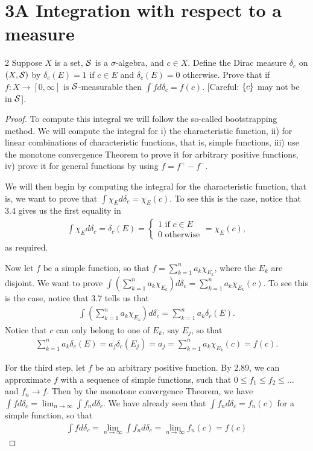 \section{3A Integration with respect to a measure}


\begin{exercise}{2}
Suppose $X$ is a set, $\mathcal{S}$ is a $\sigma$-algebra, and $c \in X$.
Define the Dirac measure $\delta_c$ on $(X,\mathcal{S})$ by $\delta_c(E) = 1$ if $c \in E$ and $\delta_c(E) = 0$ otherwise.
Prove that if $f: X \to [0, \infty]$ is $\mathcal{S}$-measurable then $\int f d\delta_c = f(c)$.
[Careful: $\{c\}$ may not be in $\mathcal{S}$].
\end{exercise}
\begin{proof}
To compute this integral we will follow the so-called bootstrapping method.
We will compute the integral for 
i) the characteristic function,
ii) for linear combinations of characteristic functions, that is, simple functions,
iii) use the monotone convergence Theorem to prove it for arbitrary positive functions,
iv) prove it for general functions by using $f = f^+ - f^-$.

We will then begin by computing the integral for the characteristic function,
that is, we want to prove that $\int \chi_E d\delta_c = \chi_E(c)$.
To see this is the case, notice that 3.4 gives us the first equality in
\begin{align*}
    \int \chi_E d\delta_c 
    = \delta_c(E)
    = \begin{cases}
        1 \text{ if } c \in E\\
        0 \text{ otherwise}
    \end{cases}
    = \chi_E(c),
\end{align*}
as required.

Now let $f$ be a simple function, so that $f = \sum_{k=1}^n a_k \chi_{E_k}$, where the $E_k$ are disjoint.
We want to prove $\int (\sum_{k=1}^n a_k \chi_{E_k}) d\delta_c = \sum_{k=1}^n a_k \chi_{E_k} (c)$.
To see this is the case, notice that 3.7 tells us that
\begin{align*}
    \int (\sum_{k=1}^n a_k \chi_{E_k}) d\delta_c = \sum_{k=1}^n a_k \delta_c(E).
\end{align*}
Notice that $c$ can only belong to one of $E_k$, say $E_j$, so that 
\begin{align*}
    \sum_{k=1}^n a_k \delta_c(E)
    = a_j \delta_c(E_j)
    = a_j
    = \sum_{k=1}^n a_k \chi_{E_k}(c) 
    = f(c).
\end{align*}

For the third step, let $f$ be an arbitrary positive function.
By 2.89, we can approximate $f$ with a sequence of simple functions, such that $0 \leq f_1 \leq f_2 \leq \dots$ and $f_n \to f$.
Then by the monotone convergence Theorem, we have $\int f d\delta_c = \lim_{n \to \infty} \int f_n d\delta_c$.
We have already seen that $\int f_n d\delta_c = f_n(c)$ for a simple function, so that 
\begin{align*}
    \int f d\delta_c 
    = \lim_{n \to \infty} \int f_n d\delta_c 
    = \lim_{n \to \infty} f_n(c) 
    = f(c)
\end{align*}


\end{proof}
